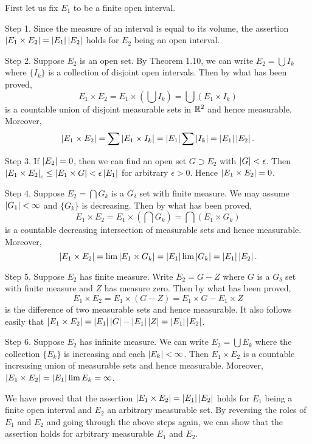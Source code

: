 \begin{exercise}{3.12}
  First let us fix $E_1$ to be a finite open interval.

  Step 1.
  Since the measure of an interval is equal to its volume,
  the assertion $\left\vert E_1 \times E_2\right\vert = \left\vert E_1\right\vert \left\vert E_2\right\vert$ holds
  for $E_2$ being an open interval.

  Step 2.
  Suppose $E_2$ is an open set.
  By Theorem 1.10,
  we can write $E_2 = \bigcup I_k$
  where $\{I_k\}$ is a collection of disjoint open intervals.
  Then by what has been proved,
  \[
    E_1 \times E_2 = E_1 \times \left( \bigcup I_k \right)
    = \bigcup \left(E_1 \times I_k\right)
  \]
  is a countable union of disjoint measurable sets in $\mathbb{R}^2$
  and hence measurable.
  Moreover,
  \[
    \left\vert E_1 \times E_2\right\vert = \sum \left\vert E_1 \times I_k\right\vert
    = \left\vert E_1\right\vert \sum \left\vert I_k\right\vert = \left\vert E_1\right\vert \left\vert E_2\right\vert.
  \]

  Step 3. If $\left\vert E_2\right\vert = 0$, then we can find an open set $G \supset E_2$
  with $\left\vert G\right\vert < \epsilon$. Then
  $\left\vert E_1 \times E_2\right\vert_\mathrm{e} \le \left\vert E_1 \times G\right\vert < \epsilon \left\vert E_1\right\vert$
  for arbitrary $\epsilon > 0$.
  Hence $\left\vert E_1 \times E_2\right\vert = 0$.

  Step 4. Suppose $E_2 = \bigcap G_k$ is a $G_\delta$ set with finite measure.
  We may assume $\left\vert G_1\right\vert < \infty$ and $\{G_k\}$ is decreasing.
  Then by what has been proved,
  \[
    E_1 \times E_2 = E_1 \times \left( \bigcap G_k \right)
    = \bigcap \left( E_1 \times G_k \right)
  \]
  is a countable decreasing intersection of measurable sets
  and hence measurable.
  Moreover,
  \[
    \left\vert E_1 \times E_2\right\vert
    = \lim \left\vert E_1 \times G_k\right\vert
    = \left\vert E_1\right\vert \lim \left\vert G_k\right\vert = \left\vert E_1\right\vert \left\vert E_2\right\vert.
  \]

  Step 5. Suppose $E_2$ has finite measure.
  Write $E_2 = G - Z$ where $G$ is a $G_{\delta}$ set with finite measure
  and $Z$ has measure zero. Then by what has been proved,
  \[
    E_1 \times E_2 = E_1 \times \left( G-Z \right)
    = E_1 \times G - E_1 \times Z
  \]
  is the difference of two measurable sets and hence measurable.
  It also follows easily that
  $\left\vert E_1 \times E_2\right\vert = \left\vert E_1\right\vert\left\vert G\right\vert - \left\vert E_1\right\vert\left\vert Z\right\vert = \left\vert E_1\right\vert\left\vert E_2\right\vert$.

  Step 6. Suppose $E_2$ has infinite measure.
  We can write $E_2 = \bigcup E_k$
  where the collection $\{E_k\}$ is increasing and each $\left\vert E_k\right\vert < \infty$.
  Then $E_1 \times E_2$ is a countable increasing union of measurable sets
  and hence measurable.
  Moreover, $\left\vert E_1 \times E_2\right\vert = \left\vert E_1\right\vert \lim {E_k} = \infty$.

  We have proved that the assertion $\left\vert E_1 \times E_2\right\vert = \left\vert E_1\right\vert \left\vert E_2\right\vert$
  holds for $E_1$ being a finite open interval and $E_2$ an arbitrary measurable set.
  By reversing the roles of $E_1$ and $E_2$
  and going through the above steps again,
  we can show that the assertion holds for arbitrary measurable $E_1$ and $E_2$.
\end{exercise}

